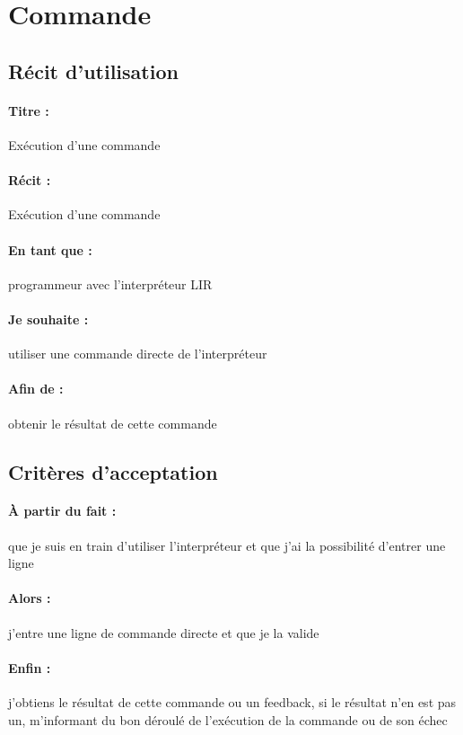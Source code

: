     \section{Commande}

    \subsection*{Récit d'utilisation}

    \paragraph{Titre : } Exécution d'une commande %
    \paragraph{Récit : } Exécution d'une commande %
    \paragraph{En tant que : } programmeur avec l'interpréteur LIR %
    \paragraph{Je souhaite : } utiliser une commande directe de l'interpréteur %
    \paragraph{Afin de : } obtenir le résultat de cette commande %

    \subsection*{Critères d'acceptation}

    \paragraph{À partir du fait : } que je suis en train d'utiliser l'interpréteur et que j'ai la possibilité d'entrer une ligne %
    \paragraph{Alors : } j'entre une ligne de commande directe et que je la valide %
    \paragraph{Enfin : } j'obtiens le résultat de cette commande ou un feedback,
    si le résultat n'en est pas un, m'informant du bon déroulé de
    l'exécution de la commande ou de son échec %